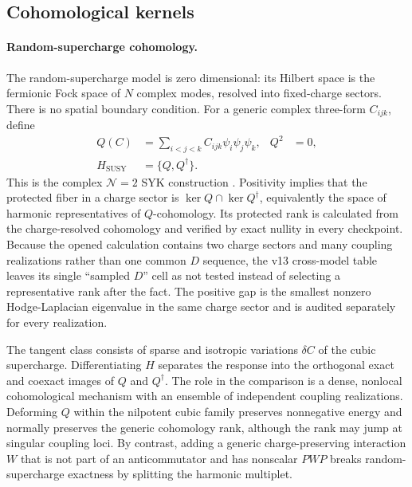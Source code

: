 \subsection{Cohomological kernels}

\paragraph*{Random-supercharge cohomology.}
The random-supercharge model is zero dimensional: its Hilbert space is the
fermionic Fock space of $N$ complex modes, resolved into fixed-charge sectors.
There is no spatial boundary condition.  For a generic complex three-form
$C_{ijk}$, define
\begin{equation}
 \begin{aligned}
 Q(C)&=\sum_{i<j<k}C_{ijk}\psi_i\psi_j\psi_k,
 &Q^2&=0,\\
 H_{\mathrm{SUSY}}&=\{Q,Q^\dagger\}.
 \end{aligned}
 \label{eq:random-supercharge}
\end{equation}
This is the complex $\mathcal N=2$ SYK construction
\cite{fu2017susy}.  Positivity implies that the protected fiber in a charge
sector is
$\ker Q\cap\ker Q^\dagger$, equivalently the space of harmonic
representatives of $Q$-cohomology.  Its protected rank is calculated from the
charge-resolved cohomology and verified by exact nullity in every checkpoint.
Because the opened calculation contains two charge sectors and many coupling
realizations rather than one common $D$ sequence, the v13 cross-model table
leaves its single ``sampled $D$'' cell as not tested instead of selecting a
representative rank after the fact.  The positive gap is the smallest nonzero
Hodge-Laplacian eigenvalue in the same charge sector and is audited separately
for every realization.

The tangent class consists of sparse and isotropic variations $\delta C$ of
the cubic supercharge.  Differentiating $H$ separates the response into the
orthogonal exact and coexact images of $Q$ and $Q^\dagger$.  The role in the
comparison is a dense, nonlocal cohomological mechanism with an ensemble of
independent coupling realizations.  Deforming $Q$ within the nilpotent cubic
family preserves nonnegative energy and normally preserves the generic
cohomology rank, although the rank may jump at singular coupling loci.  By
contrast, adding a generic charge-preserving interaction $W$ that is not part
of an anticommutator and has nonscalar $PWP$ breaks random-supercharge
exactness by splitting the harmonic multiplet.

